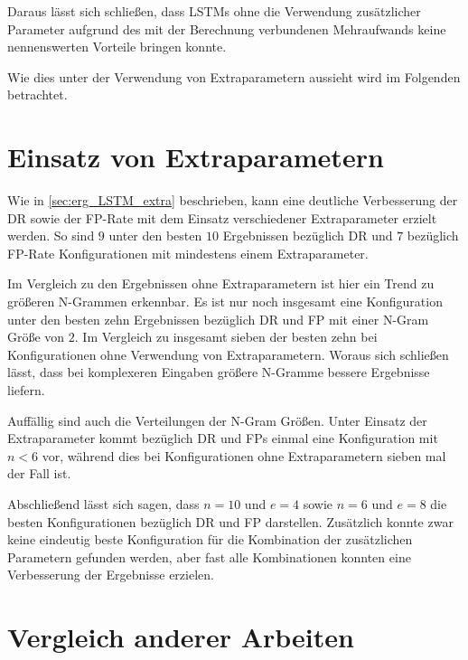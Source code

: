 Daraus lässt sich schließen, dass \acp{LSTM} ohne die Verwendung zusätzlicher Parameter aufgrund des mit der Berechnung verbundenen Mehraufwands keine nennenswerten Vorteile bringen konnte.

Wie dies unter der Verwendung von Extraparametern aussieht wird im Folgenden betrachtet.

\section{Einsatz von Extraparametern}\label{sec:folgerungen_extra}

Wie in \autoref{sec:erg_LSTM_extra} beschrieben, kann eine deutliche Verbesserung der \ac{DR} sowie  der \ac{FP}-Rate mit dem Einsatz verschiedener Extraparameter erzielt werden.
So sind $9$ unter den besten $10$ Ergebnissen bezüglich \ac{DR} und $7$ bezüglich \ac{FP}-Rate Konfigurationen mit mindestens einem Extraparameter.\par\medskip

Im Vergleich zu den Ergebnissen ohne Extraparametern ist hier ein Trend zu größeren N-Grammen erkennbar.
Es ist nur noch insgesamt eine Konfiguration unter den besten zehn Ergebnissen bezüglich \ac{DR} und \ac{FP} mit einer N-Gram Größe von $2$.
Im Vergleich zu insgesamt sieben  der besten zehn bei Konfigurationen ohne Verwendung von Extraparametern.
Woraus sich schließen lässt, dass bei komplexeren Eingaben größere N-Gramme bessere Ergebnisse liefern.\par\medskip

Auffällig sind auch die Verteilungen der N-Gram Größen.
Unter Einsatz der Extraparameter kommt bezüglich \ac{DR} und \acp{FP} einmal eine Konfiguration mit $n<6$ vor, während dies bei Konfigurationen ohne Extraparametern sieben mal der Fall ist.\par\medskip

Abschließend lässt sich sagen, dass $n=10$ und $e=4$ sowie $n=6$ und $e=8$ die besten Konfigurationen bezüglich \ac{DR} und \ac{FP} darstellen.
Zusätzlich konnte zwar keine eindeutig beste Konfiguration für die Kombination der zusätzlichen Parametern gefunden werden, aber fast alle Kombinationen konnten eine Verbesserung der Ergebnisse erzielen.

\section{Vergleich anderer Arbeiten}\label{sec:folgerungen_vgl}

